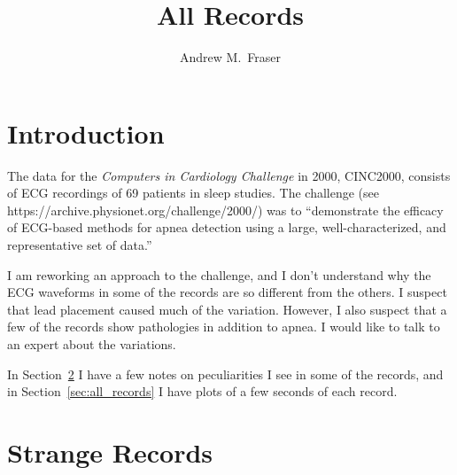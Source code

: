 \documentclass[12pt]{article}
\title{All Records}
\author{Andrew M.\ Fraser}
\begin{document}
\maketitle

\section{Introduction}
\label{sec:introduction}

The data for the \emph{Computers in Cardiology Challenge} in 2000,
CINC2000, consists of ECG recordings of 69 patients in sleep studies.
The challenge (see https://archive.physionet.org/challenge/2000/) was
to ``demonstrate the efficacy of ECG-based methods for apnea detection
using a large, well-characterized, and representative set of data.''

I am reworking an approach to the challenge, and I don't understand
why the ECG waveforms in some of the records are so different from the
others.  I suspect that lead placement caused much of the variation.
However, I also suspect that a few of the records show pathologies in
addition to apnea.  I would like to talk to an expert about the
variations.

In Section~\ref{sec:strange_records} I have a few notes on
peculiarities I see in some of the records, and in
Section~\ref{sec:all_records} I have plots of a few seconds of each
record.

\section{Strange Records}
\label{sec:strange_records}
\end{document}

